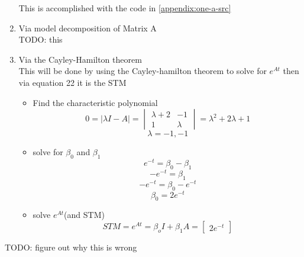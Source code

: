 \begin{enumerate}
    This is accomplished with the code in \autoref{appendix:one-a-src}
  \item Via model decomposition of Matrix A \\
    {\LARGE \color{red} TODO: this}
  \item Via the Cayley-Hamilton theorem \\
    This will be done by using the Cayley-hamilton theorem to solve for $e^{At}$ then via equation 22 it is the
    STM
    \begin{itemize}
    \item Find the characteristic polynomial \\
      \begin{equation}
        0 = |\lambda I - A| =
        \begin{vmatrix}
          \lambda +2 & -1 \\
          1 & \lambda 
        \end{vmatrix} =
        \lambda^2 + 2\lambda + 1
      \end{equation}
      \begin{equation}
        \lambda = -1,-1
      \end{equation}
    \item solve for $\beta_0$ and $\beta_1$ \\
      \begin{equation}
        e^{-t} = \beta_0 - \beta_1
      \end{equation}
      \begin{equation}
        -e^{-t} = \beta_1
      \end{equation}
      \begin{equation}
        -e^{-t} = \beta_0 - e^{-t}
      \end{equation}
      \begin{equation}
        \beta_0 =2e^{-t}
      \end{equation}
    \item solve $e^{At}$(and STM)
      \begin{equation}
        STM = e^{At} = \beta_oI + \beta_1A =
        \begin{bmatrix}
          2e^{-t}
        \end{bmatrix}
      \end{equation}
    \end{itemize}
  \end{enumerate}
  {\LARGE \color{red} TODO: figure out why this is wrong} 